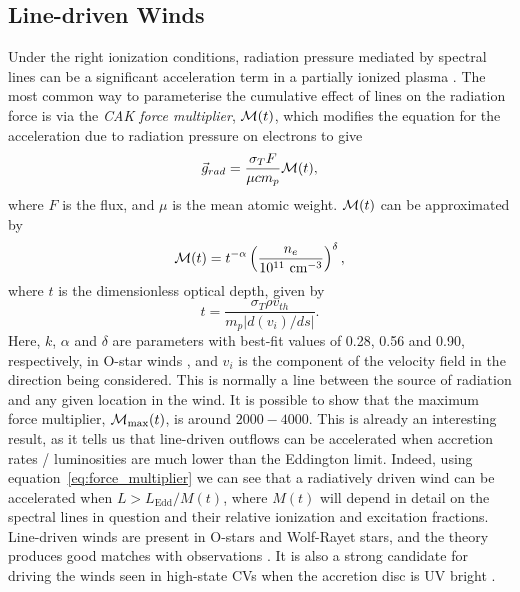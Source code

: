 \subsection{Line-driven Winds}

\label{sec:line_driving}

Under the right ionization conditions, radiation pressure mediated by spectral lines
can be a significant  acceleration term in 
a partially ionized plasma \citep[][hereafter CAK]{CAK75}. 
The most common way to parameterise the cumulative
effect of lines on the radiation force is via the 
{\em CAK force multiplier}, ${\cal M}(t)$,
which modifies the equation for the acceleration due to radiation pressure on electrons
to give \citep[][CAK]{castor1974}
\begin{equation}
\label{eq:force_multiplier}
\vec{g}_{rad} = \frac{\sigma_T F}{\mu c m_p} {\cal M}(t),
\end{equation}
where $F$ is the flux, and $\mu$ is the mean atomic weight.
${\cal M}(t)$ can be approximated by \citep{abbott1982}
\begin{equation}
\label{eq:force_multiplier2}
{\cal M}(t) = t^{-\alpha} 
\left( \frac{n_e}{10^{11}~{\rm cm}^{-3}}\right)^\delta,
\end{equation}
where $t$ is the dimensionless optical depth, given by
\begin{equation}
t = \frac{\sigma_T \rho v_{th}}{m_p | d(v_i) / ds |}.
\end{equation}
Here, $k$, $\alpha$ and $\delta$ are parameters
with best-fit 
values of 0.28, 0.56 and 0.90, respectively, in O-star winds \citep{abbott1982},
and $v_i$ is the component of the velocity field in the direction
being considered. This is normally a line between the source of radiation and any
given location in the wind. 
It is possible to show \citep[CAK, ][]{owocki1988} that the maximum force multiplier,
${\cal M}_{\mathrm{max}}(t)$,
is around $2000-4000$. This is already an interesting result, as it tells us
that line-driven outflows can be accelerated when accretion rates / luminosities
are much lower than the Eddington limit. Indeed, using 
equation~\ref{eq:force_multiplier} we can see that a radiatively driven wind 
can be accelerated when $L > L_{\mathrm{Edd}} / M(t)$, where $M(t)$ will depend in detail on
the spectral lines in question and their relative ionization and excitation fractions.
Line-driven winds are present in O-stars and Wolf-Rayet stars, and the theory
produces good matches with observations 
\citep[e.g.][]{friend1986,pauldrach1986,pauldrach1994,hamann2008}. 
It is also a strong candidate for driving
the winds seen in high-state CVs when the accretion disc is UV bright 
\citep[][see also section~\ref{sec:proga}]{pereyra1997,proga1998,proga2005}.

